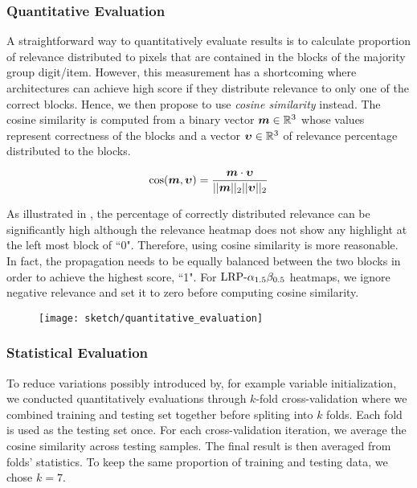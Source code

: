 \subsubsection{Quantitative Evaluation}
A straightforward way to quantitatively evaluate results is to calculate proportion of relevance distributed to pixels that are contained in the blocks of the majority group digit/item. However, this measurement has a shortcoming where architectures can achieve high score if they distribute relevance to only one of the correct blocks. Hence, we then propose to use \textit{cosine similarity} instead. The cosine similarity is computed from  a  binary  vector $\patvector{m} \in \mathbb{R}^3$  whose values represent correctness of the blocks and a vector $\patvector{\upsilon} \in \mathbb{R}^3$ of relevance percentage distributed to the blocks. 

\begin{align}
\cos (\patvector{m}, \patvector{\upsilon}) = \frac{ \patvector{m} \cdot \patvector{\upsilon}}{ || \patvector{m}  ||_2 ||\patvector{\upsilon}   ||_2}	
\end{align}

As illustrated in \addfigure{\ref{fig:quantitative_evaluation}}, the percentage of correctly distributed relevance can be significantly high although the relevance heatmap does not show any highlight at the left most block of ``0". Therefore, using cosine similarity is more reasonable. In fact, the propagation needs to be equally balanced between the two blocks in order to achieve the highest score, ``1". For $\text{LRP-}\alpha_{1.5}\beta_{0.5}$ heatmaps, we ignore negative relevance and set it to zero before computing cosine similarity.

\begin{figure}[!htb]
\centering
\texttt{[image: sketch/quantitative\_evaluation]}
\label{fig:quantitative_evaluation}
\end{figure}

\subsubsection{Statistical Evaluation}
To reduce variations possibly introduced by, for example variable initialization, we conducted quantitatively evaluations through $k$-fold cross-validation where we combined  training and testing set together before spliting into $k$ folds. Each fold is used as the testing set once. For each cross-validation iteration, we average the cosine similarity across testing samples. The final result is then averaged from folds' statistics.  To keep the same proportion of training and testing data, we chose $k=7$. 

